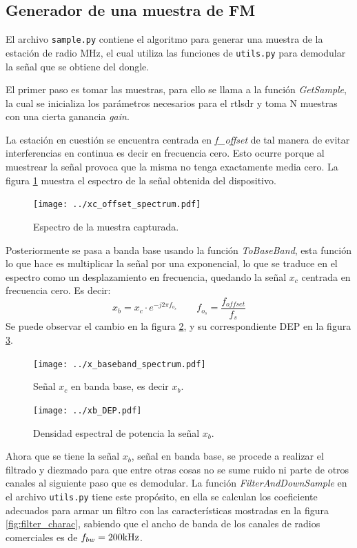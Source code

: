 \subsection{Generador de una muestra de FM}\label{sec:sample-generator}
El archivo \texttt{sample.py} contiene el algoritmo para generar una muestra de la estación de radio \sampleFM MHz, el cual utiliza las funciones de \texttt{utils.py} para demodular la señal que se obtiene del dongle.

El primer paso es tomar las muestras, para ello se llama a la función \emph{GetSample}, la cual se inicializa los parámetros necesarios para el rtlsdr y toma N muestras con una cierta ganancia \emph{gain}.

La estación en cuestión se encuentra centrada en \emph{f\_offset} de tal manera de evitar interferencias en continua es decir en frecuencia cero. Esto ocurre porque al muestrear la señal provoca que la misma no tenga exactamente media cero. 
La figura \ref{fig:xc_offset_spectrum} muestra el espectro de la señal obtenida del dispositivo.
\begin{figure}[ht!]
	\centering
	\texttt{[image: ../xc\_offset\_spectrum.pdf]}
	\caption{Espectro de la muestra capturada.}
	\label{fig:xc_offset_spectrum}
\end{figure}

Posteriormente se pasa a banda base usando la función \emph{ToBaseBand}, esta función lo que hace es multiplicar la señal por una exponencial, lo que se traduce en el espectro como un desplazamiento en frecuencia, quedando la señal $x_c$ centrada en frecuencia cero. Es decir:
$$
	x_b = x_c \cdot e^{-j 2 \pi f_{o_s}} \quad \quad f_{o_s} = \frac{f_{offset}}{f_s}
$$
Se puede observar el cambio en la figura \ref{fig:x_baseband_spectrum}, y su correspondiente DEP en la figura \ref{fig:x_baseband_DEP}.
\begin{figure}[ht!]
	\centering
	\texttt{[image: ../x\_baseband\_spectrum.pdf]}
	\caption{Señal $x_c$ en banda base, es decir $x_b$.}
	\label{fig:x_baseband_spectrum}
\end{figure}

\begin{figure}[ht!]
	\centering
	\texttt{[image: ../xb\_DEP.pdf]}
	\caption{Densidad espectral de potencia la señal $x_b$.}
	\label{fig:x_baseband_DEP}
\end{figure}

Ahora que se tiene la señal $x_b$, señal en banda base, se procede a realizar el filtrado y diezmado para que entre otras cosas no se sume ruido ni parte de otros canales al siguiente paso que es demodular.
La función \emph{FilterAndDownSample} en el archivo \texttt{utils.py} tiene este propósito, en ella se calculan los coeficiente adecuados para armar un filtro con las características mostradas en la figura \ref{fig:filter_charac}, sabiendo que el ancho de banda de los canales de radios comerciales es de $f_{bw} = 200 \mbox{kHz}$.

